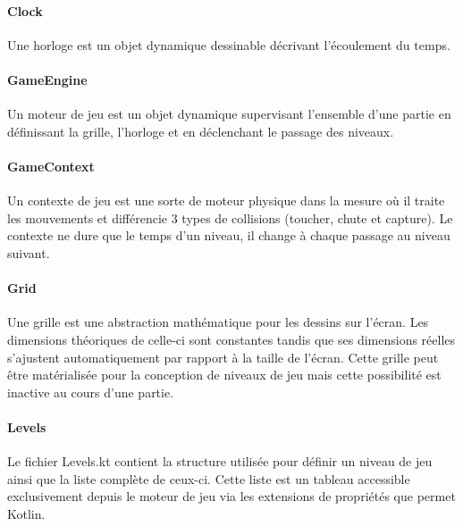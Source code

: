 \documentclass{article}
\begin{document}
\paragraph{Clock}
Une horloge est un objet dynamique dessinable décrivant l'écoulement du temps.

\paragraph{GameEngine}
Un moteur de jeu est un objet dynamique supervisant l’ensemble d'une partie en définissant la grille, l’horloge et en déclenchant le passage des niveaux.

\paragraph{GameContext}
Un contexte de jeu est une sorte de moteur physique dans la mesure où il traite les mouvements et différencie 3 types de collisions (toucher, chute et capture). Le contexte ne dure que le temps d'un niveau, il change à chaque passage au niveau suivant.

\paragraph{Grid}
Une grille est une abstraction mathématique pour les dessins sur l’écran. Les dimensions théoriques de celle-ci sont constantes tandis que ses dimensions réelles s’ajustent automatiquement par rapport à la taille de l’écran. Cette grille peut être matérialisée pour la conception de niveaux de jeu mais cette possibilité est inactive au cours d'une partie.

\paragraph{Levels}
Le fichier Levels.kt contient la structure utilisée pour définir un niveau de jeu ainsi que la liste complète de ceux-ci. Cette liste est un tableau accessible exclusivement depuis le moteur de jeu via les extensions de propriétés que permet Kotlin.
\end{document}
